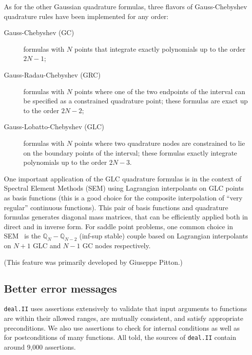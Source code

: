 \documentclass{ansarticle-preprint}
\newcommand{\specialword}[1]{\texttt{#1}}
\newcommand{\dealii}{{\specialword{deal.II}}}
\begin{document}
As for the other Gaussian quadrature formulas, three flavors of
Gauss-Chebyshev quadrature rules have been implemented for any order:
\begin{description}
\item[Gauss-Chebyshev (GC)] formulas with $N$ points that integrate
  exactly polynomials up to the order $2N-1$;
\item[Gauss-Radau-Chebyshev (GRC)] formulas with $N$ points where one of
  the two endpoints of the interval can be specified as a constrained
  quadrature point; these formulas are exact up to the order $2N-2$;
\item[Gauss-Lobatto-Chebyshev (GLC)] formulas with $N$ points where two
  quadrature nodes are constrained to lie on the boundary points of the
  interval; these formulas exactly integrate polynomials up to the order $2N-3$.
\end{description}

One important application of the GLC quadrature formulas is in the context
of Spectral Element Methods (SEM) using Lagrangian interpolants on GLC
points as basis functions (this is a good choice for the composite
interpolation of ``very regular'' continuous functions). This pair of basis
functions and quadrature formulas generates diagonal mass matrices, that
can be efficiently applied both in direct and in inverse form. For saddle
point problems, one common choice in SEM~\cite{MadayPatera} is the
$\mathbb{Q}_N-\mathbb{Q}_{N-2}$ (inf-sup stable) couple based on Lagrangian
interpolants on $N+1$ GLC and $N-1$ GC nodes respectively.

(This feature was primarily developed by Giuseppe Pitton.)


\subsection{Better error messages}

\dealii{} uses assertions extensively to validate that input arguments to
functions are within their allowed ranges, are mutually consistent, and
satisfy appropriate preconditions. We also use assertions to check for
internal conditions as well as for postconditions of many functions. All told,
the sources of \dealii{} contain around 9,000 assertions.
\end{document}
